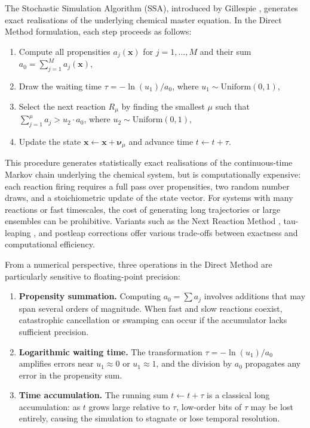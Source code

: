 \documentclass{article}
\begin{document}
The Stochastic Simulation Algorithm (SSA), introduced by Gillespie \cite{gillespie1977}, generates exact realisations of the underlying chemical master equation. In the Direct Method formulation, each step proceeds as follows:
\begin{enumerate}
    \item Compute all propensities $a_j(\mathbf{x})$ for $j = 1, \ldots, M$ and their sum $a_0 = \sum_{j=1}^{M} a_j(\mathbf{x})$,
    \item Draw the waiting time $\tau = -\ln(u_1)/a_0$, where $u_1 \sim \mathrm{Uniform}(0,1)$,
    \item Select the next reaction $R_\mu$ by finding the smallest $\mu$ such that $\sum_{j=1}^{\mu} a_j > u_2 \cdot a_0$, where $u_2 \sim \mathrm{Uniform}(0,1)$,
    \item Update the state $\mathbf{x} \leftarrow \mathbf{x} + \boldsymbol{\nu}_\mu$ and advance time $t \leftarrow t + \tau$.
\end{enumerate}

This procedure generates statistically exact realisations of the continuous-time Markov chain underlying the chemical system, but is computationally expensive: each reaction firing requires a full pass over propensities, two random number draws, and a stoichiometric update of the state vector. For systems with many reactions or fast timescales, the cost of generating long trajectories or large ensembles can be prohibitive. Variants such as the Next Reaction Method \cite{anderson2007}, tau-leaping \cite{gillespie2001,cao2006}, and postleap corrections \cite{anderson2008} offer various trade-offs between exactness and computational efficiency.

From a numerical perspective, three operations in the Direct Method are particularly sensitive to floating-point precision:
\begin{enumerate}
    \item \textbf{Propensity summation.} Computing $a_0 = \sum a_j$ involves additions that may span several orders of magnitude. When fast and slow reactions coexist, catastrophic cancellation or swamping can occur if the accumulator lacks sufficient precision.
    \item \textbf{Logarithmic waiting time.} The transformation $\tau = -\ln(u_1)/a_0$ amplifies errors near $u_1 \approx 0$ or $u_1 \approx 1$, and the division by $a_0$ propagates any error in the propensity sum.
    \item \textbf{Time accumulation.} The running sum $t \leftarrow t + \tau$ is a classical long accumulation: as $t$ grows large relative to $\tau$, low-order bits of $\tau$ may be lost entirely, causing the simulation to stagnate or lose temporal resolution.
\end{enumerate}
\end{document}
